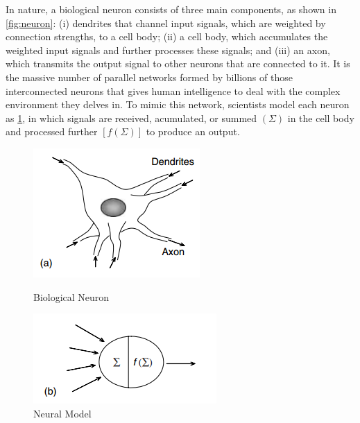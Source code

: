 \documentclass[a4paper]{book}
\begin{document}
  In nature, a biological neuron consists of three main components, as
  shown in \cref{fig:neuron}: (i) dendrites that channel input
  signals, which are weighted by connection strengths, to a cell body;
  (ii) a cell body, which accumulates the weighted input signals and
  further processes these signals; and (iii) an axon, which transmits
  the output signal to other neurons that are connected to it. It is
  the massive number of parallel networks formed by billions of those
  interconnected neurons that gives human intelligence to deal with
  the complex environment they delves in. To mimic this network,
  scientists model each neuron as \cref{fig:math_neuron}, in which
  signals are received, acumulated, or summed $(\Sigma)$ in the cell
  body and processed further $[f(\Sigma)]$ to produce an output.

  \begin{figure}
    \includegraphics[width=0.8\linewidth]{./figures/neuron.PNG}
    \caption{Biological Neuron\label{fig:neuron}}
    \endminipage
    \includegraphics[width=0.8\linewidth]{./figures/math_neuron.PNG}
    \caption{Neural Model\label{fig:math_neuron}}
    \endminipage
  \end{figure}
\end{document}
